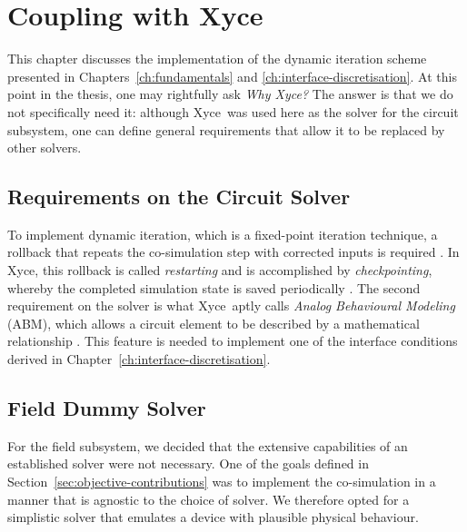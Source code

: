 
\chapter{Coupling with Xyce\texttrademark} \label{ch:xyce}
This chapter discusses the implementation of the dynamic iteration scheme presented in Chapters~\ref{ch:fundamentals} and \ref{ch:interface-discretisation}. At this point in the thesis, one may rightfully ask \textit{Why Xyce\texttrademark?} The answer is that we do not specifically need it: although Xyce\texttrademark \ was used here as the solver for the circuit subsystem, one can define general requirements that allow it to be replaced by other solvers.

\section{Requirements on the Circuit Solver} \label{sec:xyce-why}
To implement dynamic iteration, which is a fixed-point iteration technique, a rollback that repeats the co-simulation step with corrected inputs is required \cite{Gomes2017}. In Xyce\texttrademark, this rollback is called \textit{restarting} and is accomplished by \textit{checkpointing}, whereby the completed simulation state is saved periodically \cite{Keiter2025UG}. The second requirement on the solver is what Xyce\texttrademark \ aptly calls \textit{Analog Behavioural Modeling} (ABM), which allows a circuit element to be described by a mathematical relationship \cite{Keiter2025UG}. This feature is needed to implement one of the interface conditions derived in Chapter~\ref{ch:interface-discretisation}.


\section{Field Dummy Solver} \label{sec:xyce-field}
For the field subsystem, we decided that the extensive capabilities of an established solver were not necessary. One of the goals defined in Section~\ref{sec:objective-contributions} was to implement the co-simulation in a manner that is agnostic to the choice of solver. We therefore opted for a simplistic  solver that emulates a device with plausible physical behaviour.

